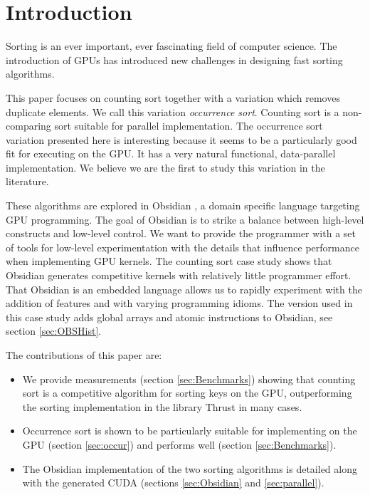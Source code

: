\section{Introduction} 

Sorting is an ever important, ever fascinating field of computer
science. The introduction of GPUs has introduced new challenges in
designing fast sorting algorithms.

This paper focuses on counting sort together with a variation which
removes duplicate elements. We call this variation
{\em occurrence sort}. Counting sort is a non-comparing sort
suitable for parallel implementation. The occurrence sort variation 
presented here is interesting because it seems to be a particularly
good fit for executing on the GPU. It has a very natural functional,
data-parallel implementation. We believe we are the first to study
this variation in the literature.

These algorithms are explored in Obsidian \cite{JSLIC,PUSH}, a domain
specific language targeting GPU programming. The goal of Obsidian is
to strike a balance between high-level constructs and low-level control. 
We want to provide the programmer with a set of tools for low-level 
experimentation with the details that influence performance when 
implementing GPU kernels. The counting sort
case study shows that Obsidian generates competitive kernels with
relatively little programmer effort. That Obsidian is an embedded language 
allows us to rapidly experiment with the addition of features and with varying 
programming idioms. The version used in this case study
adds global arrays and atomic instructions to Obsidian, see section 
\ref{sec:OBSHist}. 

The contributions of this paper are:
\begin{itemize}
\item We provide measurements (section \ref{sec:Benchmarks}) showing
  that counting sort is a competitive algorithm for sorting keys on the GPU,
  outperforming the sorting implementation in the library
  Thrust\cite{THRUST} in many cases.
\item Occurrence sort is shown to be particularly
  suitable for implementing on the GPU (section \ref{sec:occur}) and
  performs well (section \ref{sec:Benchmarks}).
\item The Obsidian implementation of the two sorting algorithms is
  detailed along with the generated CUDA (sections
  \ref{sec:Obsidian} and \ref{sec:parallel}).
\end{itemize}


